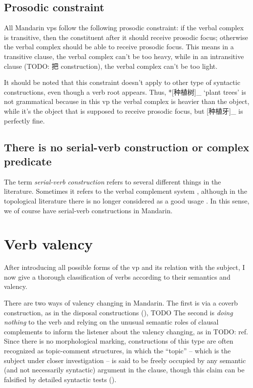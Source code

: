\documentclass[UTF8, a4paper, oneside, scheme=plain, 12pt]{ctexrep}
\newcommand*{\citesec}[1]{\S~{#1}}
\newcommand*{\term}[1]{\emph{#1}}
\newcommand{\translate}[1]{`#1'}
\begin{document}
\section{Prosodic constraint}\label{sec:vp.prosody}

All Mandarin \acs{vp}s follow the following prosodic constraint:
if the verbal complex is transitive,
then the constituent after it should receive prosodic focus; 
otherwise the verbal complex should be able to receive prosodic focus. 
This means in a transitive clause, 
the verbal complex can't be too heavy, 
while in an intransitive clause (TODO: 把 construction), 
the verbal complex can't be too light. 

It should be noted that this constraint doesn't apply 
to other type of syntactic constructions, 
even though a verb root appears. 
Thus, *[种植树]_{} \translate{plant trees} 
is not grammatical
because in this \acs{vp} the verbal complex is heavier than the object, 
while it's the object that is supposed to receive prosodic focus, 
but [种植牙]_{} is perfectly fine. 


\section{There is no serial-verb construction or complex predicate}\label{sec:no-serial-verb}

The term \term{serial-verb construction} refers to several different things in the literature.
Sometimes it refers to the verbal complement system
\citep{chen2016mandarin}, 
although in the topological literature 
there is no longer considered as a good usage 
\citep[\citesec{10.1}; note that %
the V2s in Yakkha complex predication highly resembles Mandarin directional verbal complements 
in their formal aspects]{schackow2015grammar}. 
In this sense, we of course have serial-verb constructions in Mandarin.

\chapter{Verb valency}

After introducing all possible forms of the \acs{vp}
and its relation with the subject,
I now give a thorough classification of verbs 
according to their semantics and valency.

There are two ways of valency changing in Mandarin.
The first is via a coverb construction, 
as in the disposal constructions (),
TODO 
The second is \emph{doing nothing} to the verb 
and relying on the unusual semantic roles of clausal complements 
to inform the listener about the valency changing,
as in TODO: ref.
Since there is no morphological marking,
constructions of this type are often recognized as topic-comment structures,
in which the ``topic'' -- which is the subject under closer investigation -- 
is said to be freely occupied by any semantic (and not necessarily syntactic) argument in the clause,
though this claim can be falsified by detailed syntactic tests ().
\end{document}

